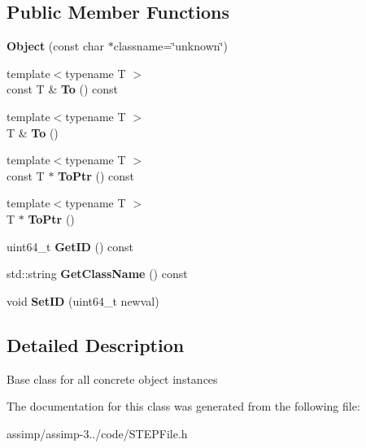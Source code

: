 \subsection*{Public Member Functions}
\begin{DoxyCompactItemize}
\item 
\hypertarget{class_assimp_1_1_s_t_e_p_1_1_object_a616718f7d7aaa42c615ee60dd8ce8518}{{\bfseries Object} (const char $\ast$classname=\char`\"{}unknown\char`\"{})}\label{class_assimp_1_1_s_t_e_p_1_1_object_a616718f7d7aaa42c615ee60dd8ce8518}

\item 
\hypertarget{class_assimp_1_1_s_t_e_p_1_1_object_a9c0b1231e388d22bd948a665a44edabe}{{\footnotesize template$<$typename T $>$ }\\const T \& {\bfseries To} () const }\label{class_assimp_1_1_s_t_e_p_1_1_object_a9c0b1231e388d22bd948a665a44edabe}

\item 
\hypertarget{class_assimp_1_1_s_t_e_p_1_1_object_a0f852c38bd3f223e018e63a347017a83}{{\footnotesize template$<$typename T $>$ }\\T \& {\bfseries To} ()}\label{class_assimp_1_1_s_t_e_p_1_1_object_a0f852c38bd3f223e018e63a347017a83}

\item 
\hypertarget{class_assimp_1_1_s_t_e_p_1_1_object_a0292ffab3f3ed22e763a5a2cb63f5a0f}{{\footnotesize template$<$typename T $>$ }\\const T $\ast$ {\bfseries To\+Ptr} () const }\label{class_assimp_1_1_s_t_e_p_1_1_object_a0292ffab3f3ed22e763a5a2cb63f5a0f}

\item 
\hypertarget{class_assimp_1_1_s_t_e_p_1_1_object_a3c60216cd5a7c25550e86f39a95153f4}{{\footnotesize template$<$typename T $>$ }\\T $\ast$ {\bfseries To\+Ptr} ()}\label{class_assimp_1_1_s_t_e_p_1_1_object_a3c60216cd5a7c25550e86f39a95153f4}

\item 
\hypertarget{class_assimp_1_1_s_t_e_p_1_1_object_a937fc80c1203151c08f036f6898a2542}{uint64\+\_\+t {\bfseries Get\+I\+D} () const }\label{class_assimp_1_1_s_t_e_p_1_1_object_a937fc80c1203151c08f036f6898a2542}

\item 
\hypertarget{class_assimp_1_1_s_t_e_p_1_1_object_a589e7f00bbca198c13d6b6cbeb66228f}{std\+::string {\bfseries Get\+Class\+Name} () const }\label{class_assimp_1_1_s_t_e_p_1_1_object_a589e7f00bbca198c13d6b6cbeb66228f}

\item 
\hypertarget{class_assimp_1_1_s_t_e_p_1_1_object_ad9026d9428399cbc3018a16efa202b76}{void {\bfseries Set\+I\+D} (uint64\+\_\+t newval)}\label{class_assimp_1_1_s_t_e_p_1_1_object_ad9026d9428399cbc3018a16efa202b76}

\end{DoxyCompactItemize}


\subsection{Detailed Description}
Base class for all concrete object instances 

The documentation for this class was generated from the following file\+:\begin{DoxyCompactItemize}
\item 
assimp/assimp-\/3../code/S\+T\+E\+P\+File.\+h\end{DoxyCompactItemize}

